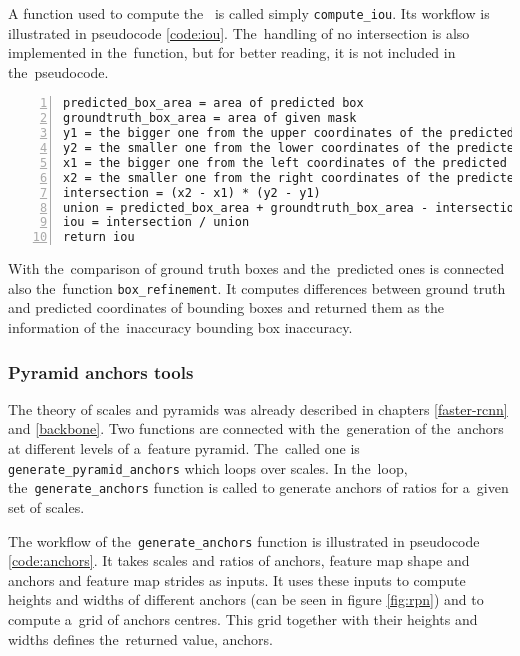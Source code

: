 A function used to compute the~ is called simply \verb|compute_iou|. Its 
workflow is illustrated in pseudocode \ref{code:iou}. The~handling of no 
intersection is also implemented in the~function, but for better reading, it is 
not included in the~pseudocode.

{\scriptsize
\begin{lstlisting}[style=python, caption={compute\_iou}, captionpos=b, 
label=code:iou, deletekeywords={from, and},
backgroundcolor = \color{light-gray}, numbers=left, breaklines=true]
predicted_box_area = area of predicted box
groundtruth_box_area = area of given mask
y1 = the bigger one from the upper coordinates of the predicted and ground truth bboxes
y2 = the smaller one from the lower coordinates of the predicted and ground truth bboxes
x1 = the bigger one from the left coordinates of the predicted and ground truth bboxes
x2 = the smaller one from the right coordinates of the predicted and ground truth bboxes
intersection = (x2 - x1) * (y2 - y1)
union = predicted_box_area + groundtruth_box_area - intersection
iou = intersection / union
return iou
\end{lstlisting}}

With the~comparison of ground truth boxes and the~predicted ones is connected 
also the~function \verb|box_refinement|. It computes differences between ground 
truth and predicted coordinates of bounding boxes and returned them as the~
information of the~inaccuracy bounding box inaccuracy.


\subsubsection{Pyramid anchors tools}
\label{anchors-func}

The theory of scales and pyramids was already described in chapters 
\ref{faster-rcnn} and \ref{backbone}. Two functions are connected with
the~generation of the~anchors at different levels of a~feature pyramid. The~called 
one is \verb|generate_pyramid_anchors| which loops over scales. In the~loop,
the~\verb|generate_anchors| function is called to generate anchors of ratios for
a~given set of scales. 

The workflow of the~\verb|generate_anchors| function is illustrated in 
pseudocode \ref{code:anchors}. It takes scales and ratios of anchors, feature
map shape and anchors and feature map strides as inputs. It uses these inputs
to compute heights and widths of different anchors (can be seen in figure
\ref{fig:rpn}) and to compute a~grid of anchors centres. This grid together
with their heights and widths defines the~returned value, anchors.

